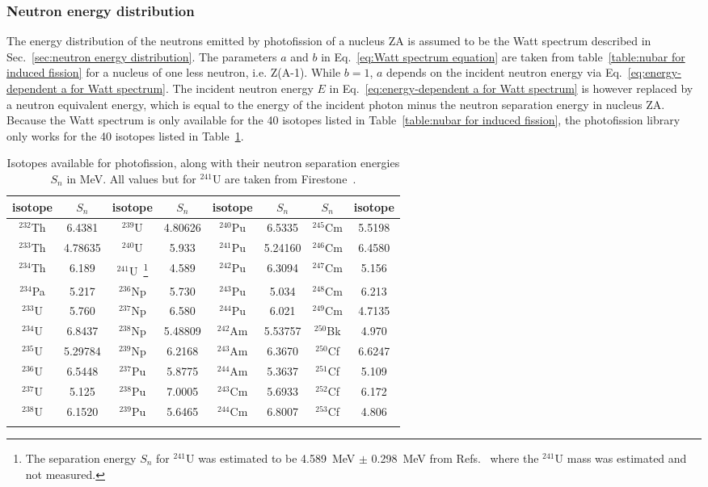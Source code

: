 \vspace{-.5\baselineskip}%
\subsubsection*{Neutron energy distribution}\label{sec:neutron energy distribution for photofission}
The energy distribution of the neutrons emitted by photofission of
a nucleus ZA is assumed to be the Watt spectrum described in 
Sec.~\ref{sec:neutron energy distribution}. The parameters $a$ and $b$
in Eq.~\ref{eq:Watt spectrum equation} are taken from 
table~\ref{table:nubar for induced fission} for a nucleus of 
one less neutron, i.e. Z(A-1). While $b=1$, $a$ depends on the incident 
neutron energy via Eq.~\ref{eq:energy-dependent a for Watt spectrum}. 
The incident neutron energy $E$ in 
Eq.~\ref{eq:energy-dependent a for Watt spectrum} is however replaced 
by a neutron equivalent energy, which is equal to the energy of the 
incident photon minus the neutron separation energy in nucleus ZA.
Because the Watt spectrum is only available for the 40 isotopes listed in Table~\ref{table:nubar for induced fission}, the photofission library only works for the 40 isotopes listed in Table~\ref{table:photofission isotopes}.
%
\begin{longtable}{|c|c||c|c||c|c||c|c|}
\caption{Isotopes available for photofission, along with their neutron separation energies $S_n$ in MeV. All values but for $^{241}$U are taken from Firestone~\cite{Firestone 1996}.}\label{table:photofission isotopes}\\
\hline
isotope    & $S_n$   & isotope    & $S_n$   & isotope    & $S_n$   & $S_n$   & isotope \\
\hline
$^{232}$Th & 6.4381  & $^{239}$U  & 4.80626 & $^{240}$Pu & 6.5335  & $^{245}$Cm & 5.5198 \\
$^{233}$Th & 4.78635 & $^{240}$U  & 5.933   & $^{241}$Pu & 5.24160 & $^{246}$Cm & 6.4580 \\
$^{234}$Th & 6.189   & $^{241}$U~\footnote{The separation energy $S_n$ for $^{241}$U was estimated to be 4.589~MeV $\pm$ 0.298~MeV from Refs.~\cite{Wapstra 2003, Audi 2003} where the $^{241}$U mass was estimated and not measured.}  & 4.589   & $^{242}$Pu & 6.3094  & $^{247}$Cm & 5.156 \\
$^{234}$Pa & 5.217   & $^{236}$Np & 5.730   & $^{243}$Pu & 5.034   & $^{248}$Cm & 6.213 \\
$^{233}$U  & 5.760   & $^{237}$Np & 6.580   & $^{244}$Pu & 6.021   & $^{249}$Cm & 4.7135 \\
$^{234}$U  & 6.8437  & $^{238}$Np & 5.48809 & $^{242}$Am & 5.53757 & $^{250}$Bk & 4.970 \\
$^{235}$U  & 5.29784 & $^{239}$Np & 6.2168  & $^{243}$Am & 6.3670  & $^{250}$Cf & 6.6247 \\
$^{236}$U  & 6.5448  & $^{237}$Pu & 5.8775  & $^{244}$Am & 5.3637  & $^{251}$Cf & 5.109 \\
$^{237}$U  & 5.125   & $^{238}$Pu & 7.0005  & $^{243}$Cm & 5.6933  & $^{252}$Cf & 6.172 \\
$^{238}$U  & 6.1520  & $^{239}$Pu & 5.6465  & $^{244}$Cm & 6.8007  & $^{253}$Cf & 4.806 \\
\hline
\pagebreak
\end{longtable}
